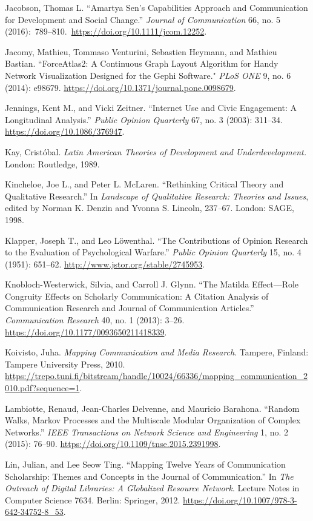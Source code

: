 \documentclass{tufte-handout}
\begin{document}
\begin{hangparas}{.25in}{1}
Jacobson, Thomas L. ``Amartya Sen's Capabilities Approach and
Communication for Development and Social Change.'' \emph{Journal of
Communication} 66, no. 5
(2016):~789--810.~\url{https://doi.org/10.1111/jcom.12252}.

Jacomy, Mathieu, Tommaso Venturini, Sebastien Heymann, and Mathieu
Bastian. ``ForceAtlas2: A Continuous Graph Layout Algorithm for Handy
Network Visualization Designed for the Gephi Software." \emph{PLoS ONE}
9, no. 6 (2014): e98679.
\url{https://doi.org/10.1371/journal.pone.0098679}.

Jennings, Kent M., and Vicki Zeitner. ``Internet Use and Civic
Engagement: A Longitudinal Analysis.'' \emph{Public Opinion Quarterly}
67, no. 3 (2003): 311--34. \url{https://doi.org/10.1086/376947}.

Kay, Cristóbal. \emph{Latin American Theories of Development and
Underdevelopment.} London: Routledge, 1989.

Kincheloe, Joe L., and Peter L. McLaren. ``Rethinking Critical Theory
and Qualitative Research.'' In \emph{Landscape of Qualitative Research:
Theories and Issues}, edited by Norman K. Denzin and Yvonna S. Lincoln,
237\emph{--}67. London: SAGE, 1998.

Klapper, Joseph T., and Leo Löwenthal. ``The Contributions of Opinion
Research to the Evaluation of Psychological Warfare.'' \emph{Public
Opinion Quarterly} 15, no. 4 (1951): 651--62.
\url{http://www.jstor.org/stable/2745953}.

Knobloch-Westerwick, Silvia, and Carroll J. Glynn. ``The Matilda
Effect---Role Congruity Effects on Scholarly Communication: A Citation
Analysis of Communication Research and Journal of Communication
Articles.'' \emph{Communication Research} 40, no. 1 (2013): 3--26.
\url{https://doi.org/10.1177/0093650211418339}.

Koivisto, Juha. \emph{Mapping Communication and Media Research}.
Tampere, Finland: Tampere University Press, 2010.
\url{https://trepo.tuni.fi/bitstream/handle/10024/66336/mapping_communication_2010.pdf?sequence=1}.

Lambiotte, Renaud, Jean-Charles Delvenne, and Mauricio Barahona.
``Random Walks, Markov Processes and the Multiscale Modular Organization
of Complex Networks.'' \emph{IEEE Transactions on Network Science and
Engineering} 1, no. 2 (2015): 76--90\emph{.}
\url{https://doi.org/10.1109/tnse.2015.2391998}.

Lin, Julian, and Lee Seow Ting. ``Mapping Twelve Years of Communication
Scholarship: Themes and Concepts in the Journal of Communication.'' In
\emph{The Outreach of Digital Libraries: A Globalized Resource Network}.
Lecture Notes in Computer Science 7634. Berlin: Springer, 2012.
\url{https://doi.org/10.1007/978-3-642-34752-8_53}.


\end{hangparas}
\end{document}
